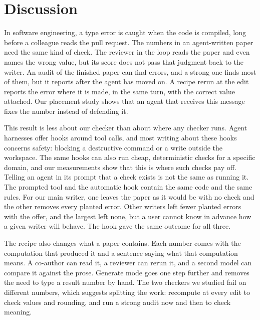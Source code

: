 \section{Discussion}
\label{sec:discussion}

In software engineering, a type error is caught when the code is compiled, long before a colleague reads the pull
request. The numbers in an agent-written paper need the same kind of check. The reviewer in the loop reads the paper
and even names the wrong value, but its score does not pass that judgment back to the writer. An audit of the
finished paper can find errors, and a strong one finds most of them, but it reports after the agent has moved on. A
recipe rerun at the edit reports the error where it is made, in the same turn, with the correct value attached. Our
placement study shows that an agent that receives this message fixes the number instead of defending it.

This result is less about our checker than about where any checker runs. Agent harnesses offer hooks around tool
calls, and most writing about these hooks concerns safety: blocking a destructive command or a write outside the
workspace. The same hooks can also run cheap, deterministic checks for a specific domain, and our measurements show
that this is where such checks pay off. Telling an agent in its prompt that a check exists is not
the same as running it. The prompted tool and the automatic hook contain the same code and the same rules. For our main
writer, one leaves the paper as it would be with no check and the other removes every planted error. Other writers
left fewer planted errors with the offer, and the largest left none, but a user cannot know in advance how a given
writer will behave. The hook gave the same outcome for all three.

The recipe also changes what a paper contains. Each number comes with the computation that produced it and a sentence
saying what that computation means. A co-author can read it, a reviewer can rerun it, and a second model can compare
it against the prose. Generate mode goes one step further and removes the need to type a result number by hand. The
two checkers we studied fail on different numbers, which suggests splitting the work: recompute at every edit to
check values and rounding, and run a strong audit now and then to check meaning.

